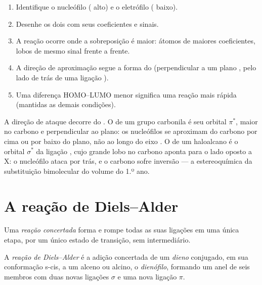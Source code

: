 \begin{method}\label{met:b2:frontier-orbitals:fmo}
\begin{enumerate}
  \item Identifique o nucleófilo ( alto) e o eletrófilo ( baixo).
  \item Desenhe os dois  com seus coeficientes e sinais.
  \item A reação ocorre onde a sobreposição é maior: átomos de maiores
        coeficientes, lobos de mesmo sinal frente a frente.
  \item A direção de aproximação segue a forma do  (perpendicular a um
        plano , pelo lado de trás de uma ligação ).
  \item Uma diferença HOMO--LUMO menor significa uma reação mais rápida
        (mantidas as demais condições).
\end{enumerate}
\end{method}

A direção de ataque decorre do . O  de um grupo carbonila é seu
orbital $\pi^*$, maior no carbono e perpendicular ao plano: os nucleófilos se
aproximam do carbono por cima ou por baixo do plano, não ao longo do eixo
. O  de um haloalcano é o orbital $\sigma^*$ da ligação , cujo
grande lobo no carbono aponta para o lado oposto a X: o nucleófilo ataca por
trás, e o carbono sofre inversão --- a estereoquímica da substituição
bimolecular do volume do 1.º ano.

\section{A reação de Diels--Alder}

\begin{definition}\label{def:b2:frontier-orbitals:concerted}
Uma \emph{reação concertada} forma e rompe todas as
suas ligações em uma única etapa, por um único estado de transição, sem
intermediário.
\end{definition}

\begin{definition}\label{def:b2:frontier-orbitals:diels-alder}
A \emph{reação de Diels--Alder} é a adição concertada
de um \emph{dieno} conjugado, em sua conformação s-cis, a um alceno ou
alcino, o \emph{dienófilo}, formando um anel de seis
membros com duas novas ligações $\sigma$ e uma nova ligação $\pi$.
\end{definition}

